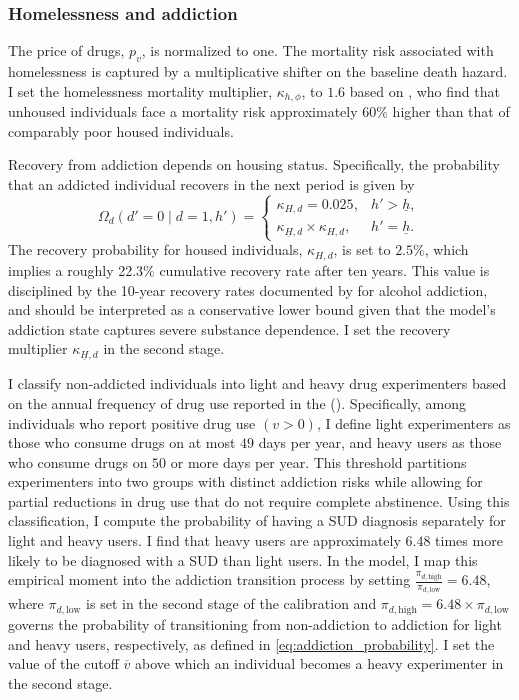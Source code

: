 \documentclass[parskip=full]{article}
\theoremstyle{plain}
\theoremstyle{definition}
\theoremstyle{remark}
\newcommand{\citetshort}[1]{\citetalias{#1} (\citeyear{#1})}
\begin{document}
\subsubsection{Homelessness and addiction}\label{sec:external_calibration_homeless_addicted}

The price of drugs, $p_v$, is normalized to one. The mortality risk associated with homelessness is captured by a multiplicative shifter on the baseline death hazard. I set the homelessness mortality multiplier, $\kappa_{h,\phi}$, to $1.6$ based on \citet{meyer_wyse_logani_2024_mortality}, who find that unhoused individuals face a mortality risk approximately 60\% higher than that of comparably poor housed individuals.

Recovery from addiction depends on housing status. Specifically, the probability that an addicted individual recovers in the next period is given by
\begin{equation*}
\Omega_d(d'=0 \mid d=1,h')=
\begin{cases}
\kappa_{H,d}=0.025, & h'>\underline h,\\
\kappa_{\underline H,d}\times \kappa_{H,d}, & h'=\underline h.
\end{cases}
\end{equation*}
The recovery probability for housed individuals, $\kappa_{H,d}$, is set to $2.5\%$, which implies a roughly 22.3\% cumulative recovery rate after ten years. This value is disciplined by 
the 10-year recovery rates documented by \citet{vaillant1995natural} 
for alcohol addiction, and should be interpreted as a conservative 
lower bound given that the model's addiction state captures severe substance dependence. I set the recovery multiplier $\kappa_{\underline H,d}$ in the second stage. 

I classify non-addicted individuals into light and heavy drug experimenters based on the annual frequency of drug use reported in the \citetshort{nsduh_2024}. Specifically, among individuals who report positive drug use $(v>0)$, I define light experimenters as those who consume drugs on at most $49$ days per year, and heavy users as those who consume drugs on $50$ or more days per year. This threshold partitions experimenters into two groups with distinct addiction risks while allowing for partial reductions in drug use that do not require complete abstinence. Using this classification, I compute the probability of having a SUD diagnosis separately for light and heavy users. I find that heavy users are approximately $6.48$ times more likely to be diagnosed with a SUD than light users. In the model, I map this empirical moment into the addiction transition process by setting $\frac{\pi_{d,\text{high}}}{\pi_{d,\text{low}}} = 6.48$, 
where $\pi_{d,\text{low}}$ is set in the second stage of the calibration and $\pi_{d,\text{high}}=6.48 \times \pi_{d,\text{low}}$ governs the probability of transitioning from non-addiction to addiction for light and heavy users, respectively, as defined in \eqref{eq:addiction_probability}. I set the value of the cutoff $\overline{v}$ above which an individual becomes a heavy experimenter in the second stage.
\end{document}
